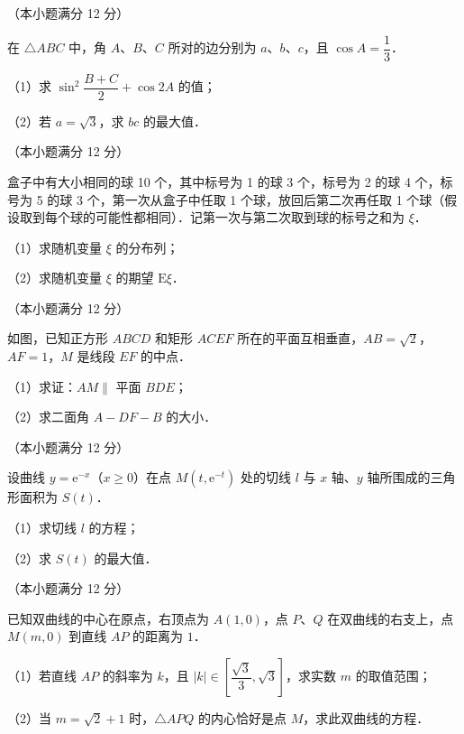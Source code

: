 \begin{question}
（本小题满分 12 分）

在 $\triangle ABC$ 中，角 $A$、$B$、$C$ 所对的边分别为 $a$、$b$、$c$，且 $\cos A = \dfrac{1}{3}$．

（1）求 $\sin^2\dfrac{B+C}{2} + \cos 2A$ 的值；

（2）若 $a = \sqrt{3}$，求 $bc$ 的最大值．

\end{question}
\begin{question}
（本小题满分 12 分）

盒子中有大小相同的球 10 个，其中标号为 1 的球 3 个，标号为 2 的球 4 个，标号为 5 的球 3 个，第一次从盒子中任取 1 个球，放回后第二次再任取 1 个球（假设取到每个球的可能性都相同）．记第一次与第二次取到球的标号之和为 $\xi$．

（1）求随机变量 $\xi$ 的分布列；

（2）求随机变量 $\xi$ 的期望 $\mathrm{E}\xi$．

\Needspace{0.4\textheight}
\end{question}
\begin{question}
（本小题满分 12 分）

如图，已知正方形 $ABCD$ 和矩形 $ACEF$ 所在的平面互相垂直，$AB = \sqrt{2}$，$AF = 1$，$M$ 是线段 $EF$ 的中点．

（1）求证：$AM \parallel$ 平面 $BDE$；

（2）求二面角 $A - DF - B$ 的大小．
\nopagebreak[4]
\begin{center}\end{center}
\nopagebreak[4]
\end{question}
\begin{question}
（本小题满分 12 分）

设曲线 $y = \mathrm{e}^{-x}$（$x \geqslant 0$）在点 $M(t, \mathrm{e}^{-t})$ 处的切线 $l$ 与 $x$ 轴、$y$ 轴所围成的三角形面积为 $S(t)$．

（1）求切线 $l$ 的方程；

（2）求 $S(t)$ 的最大值．

\end{question}
\begin{question}
（本小题满分 12 分）

已知双曲线的中心在原点，右顶点为 $A(1, 0)$，点 $P$、$Q$ 在双曲线的右支上，点 $M(m, 0)$ 到直线 $AP$ 的距离为 $1$．

（1）若直线 $AP$ 的斜率为 $k$，且 $|k| \in \left[\dfrac{\sqrt{3}}{3}, \sqrt{3}\right]$，求实数 $m$ 的取值范围；

（2）当 $m = \sqrt{2} + 1$ 时，$\triangle APQ$ 的内心恰好是点 $M$，求此双曲线的方程．

\Needspace{0.4\textheight}
\end{question}
